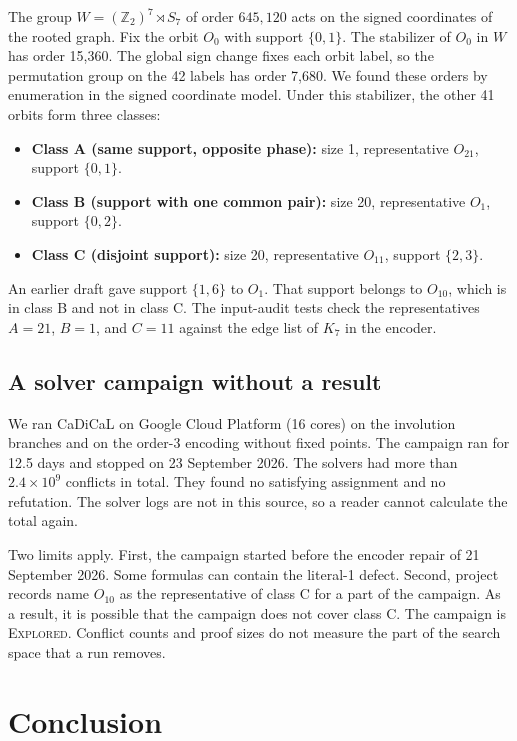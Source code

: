 \documentclass[pdflatex,sn-mathphys-num]{sn-jnl}
\theoremstyle{thmstyleone}
\theoremstyle{thmstyletwo}
\theoremstyle{thmstylethree}
\numberwithin{equation}{section}
\begin{document}
The group $W = (\mathbb{Z}_2)^7 \rtimes S_7$ of order $645{,}120$ acts on the signed coordinates of the rooted graph. Fix the orbit $O_0$ with support $\{0, 1\}$. The stabilizer of $O_0$ in $W$ has order 15{,}360. The global sign change fixes each orbit label, so the permutation group on the 42 labels has order 7{,}680. We found these orders by enumeration in the signed coordinate model. Under this stabilizer, the other 41 orbits form three classes:
\begin{itemize}
 \item \textbf{Class A (same support, opposite phase):} size 1, representative $O_{21}$, support $\{0, 1\}$.
 \item \textbf{Class B (support with one common pair):} size 20, representative $O_1$, support $\{0, 2\}$.
 \item \textbf{Class C (disjoint support):} size 20, representative $O_{11}$, support $\{2, 3\}$.
\end{itemize}
An earlier draft gave support $\{1, 6\}$ to $O_1$. That support belongs to $O_{10}$, which is in class B and not in class C. The input-audit tests check the representatives $A=21$, $B=1$, and $C=11$ against the edge list of $K_7$ in the encoder.

\subsection{A solver campaign without a result}

We ran CaDiCaL on Google Cloud Platform (16 cores) on the involution branches and on the order-3 encoding without fixed points. The campaign ran for 12.5 days and stopped on 23 September 2026. The solvers had more than $2.4 \times 10^9$ conflicts in total. They found no satisfying assignment and no refutation. The solver logs are not in this source, so a reader cannot calculate the total again.

Two limits apply. First, the campaign started before the encoder repair of 21 September 2026. Some formulas can contain the literal-1 defect. Second, project records name $O_{10}$ as the representative of class C for a part of the campaign. As a result, it is possible that the campaign does not cover class C.
The campaign is \textsc{Explored}. Conflict counts and proof sizes do not measure the part of the search space that a run removes.

\section{Conclusion}
\end{document}
